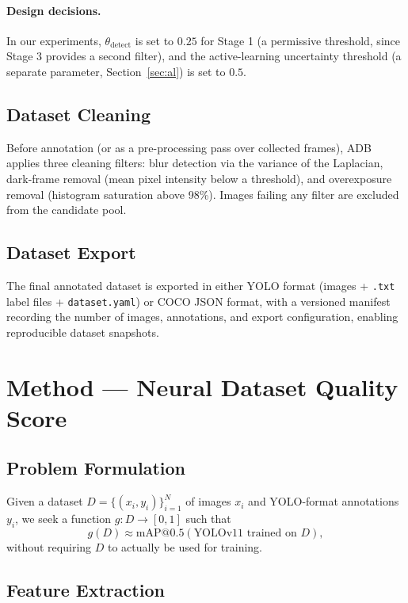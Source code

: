 \documentclass[11pt]{article}
\begin{document}
\paragraph{Design decisions.} In our experiments, $\theta_{\text{detect}}$ is
set to $0.25$ for Stage 1 (a permissive threshold, since Stage 3 provides a
second filter), and the active-learning uncertainty threshold (a separate
parameter, Section~\ref{sec:al}) is set to $0.5$.

\subsection{Dataset Cleaning}

Before annotation (or as a pre-processing pass over collected frames), ADB
applies three cleaning filters: blur detection via the variance of the
Laplacian, dark-frame removal (mean pixel intensity below a threshold), and
overexposure removal (histogram saturation above 98\%). Images failing any
filter are excluded from the candidate pool.

\subsection{Dataset Export}

The final annotated dataset is exported in either YOLO format (images +
\texttt{.txt} label files + \texttt{dataset.yaml}) or COCO JSON format, with
a versioned manifest recording the number of images, annotations, and export
configuration, enabling reproducible dataset snapshots.

\section{Method --- Neural Dataset Quality Score}
\label{sec:dqs}

\subsection{Problem Formulation}

Given a dataset $D = \{(x_i, y_i)\}_{i=1}^{N}$ of images $x_i$ and YOLO-format
annotations $y_i$, we seek a function $g: D \to [0,1]$ such that
\begin{equation}
g(D) \approx \mathrm{mAP@0.5}(\text{YOLOv11 trained on } D),
\end{equation}
without requiring $D$ to actually be used for training.

\subsection{Feature Extraction}
\end{document}

